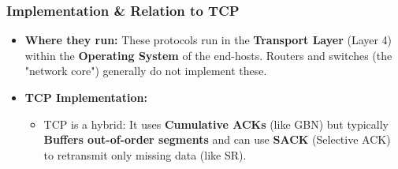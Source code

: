 \subsubsection{Implementation \& Relation to TCP}
\begin{itemize}
    \item \textbf{Where they run:} These protocols run in the \textbf{Transport Layer} (Layer 4) within the \textbf{Operating System} of the end-hosts. Routers and switches (the "network core") generally do not implement these.
    \item \textbf{TCP Implementation:} 
    \begin{itemize}
        \item TCP is a hybrid: It uses \textbf{Cumulative ACKs} (like GBN) but typically \textbf{Buffers out-of-order segments} and can use \textbf{SACK} (Selective ACK) to retransmit only missing data (like SR).
    \end{itemize}
\end{itemize}